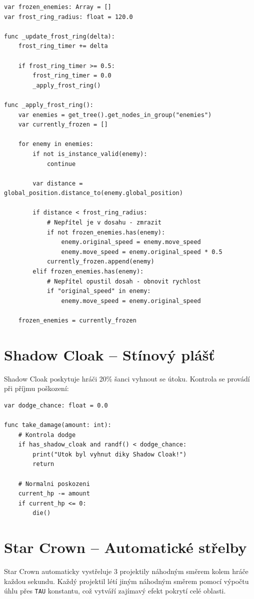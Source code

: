 \documentclass[12pt, a4paper,
oneside
]{report}
\begin{document}
\begin{lstlisting}[style=GDScript, caption={Frost Ring implementace}]
var frozen_enemies: Array = []
var frost_ring_radius: float = 120.0

func _update_frost_ring(delta):
	frost_ring_timer += delta
	
	if frost_ring_timer >= 0.5:
		frost_ring_timer = 0.0
		_apply_frost_ring()

func _apply_frost_ring():
	var enemies = get_tree().get_nodes_in_group("enemies")
	var currently_frozen = []
	
	for enemy in enemies:
		if not is_instance_valid(enemy):
			continue
			
		var distance = global_position.distance_to(enemy.global_position)
		
		if distance < frost_ring_radius:
			# Nepřítel je v dosahu - zmrazit
			if not frozen_enemies.has(enemy):
				enemy.original_speed = enemy.move_speed
				enemy.move_speed = enemy.original_speed * 0.5
			currently_frozen.append(enemy)
		elif frozen_enemies.has(enemy):
			# Nepřítel opustil dosah - obnovit rychlost
			if "original_speed" in enemy:
				enemy.move_speed = enemy.original_speed
	
	frozen_enemies = currently_frozen
\end{lstlisting}

	\section{Shadow Cloak -- Stínový plášť}
	
	Shadow Cloak poskytuje hráči 20\% šanci vyhnout se útoku. Kontrola se provádí při příjmu poškození:
	
\begin{lstlisting}[style=GDScript, caption={Shadow Cloak implementace}]
var dodge_chance: float = 0.0

func take_damage(amount: int):
	# Kontrola dodge
	if has_shadow_cloak and randf() < dodge_chance:
		print("Utok byl vyhnut diky Shadow Cloak!")
		return
	
	# Normalni poskozeni
	current_hp -= amount
	if current_hp <= 0:
		die()
\end{lstlisting}

	\section{Star Crown -- Automatické střelby}
	\nopagebreak
	
	Star Crown automaticky vystřeluje 3 projektily náhodným směrem kolem hráče každou sekundu. Každý projektil létí jiným náhodným směrem pomocí výpočtu úhlu přes \texttt{TAU} konstantu, což vytváří zajímavý efekt pokrytí celé oblasti.
\end{document}
